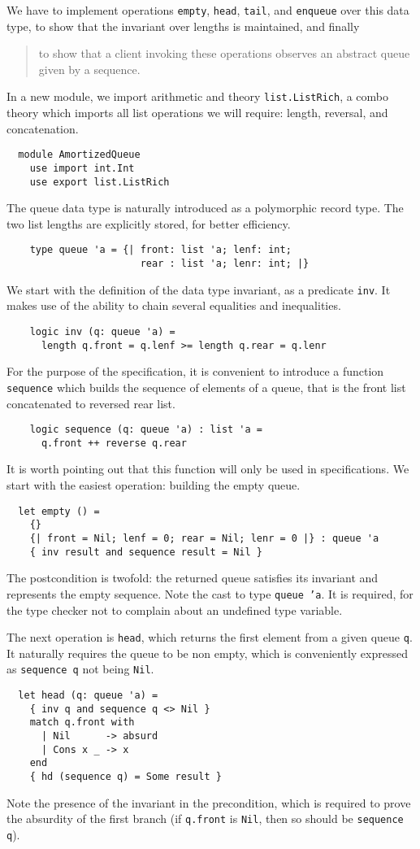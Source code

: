 We have to implement operations \texttt{empty}, \texttt{head},
\texttt{tail}, and \texttt{enqueue} over this data type,
to show that the invariant over lengths is maintained, and finally
\begin{quote}
  to show that a client invoking these operations
  observes an abstract queue given by a sequence.
\end{quote}
In a new module, we import arithmetic and theory
\texttt{list.ListRich}, a combo theory which imports all list
operations we will require: length, reversal, and concatenation.
\begin{verbatim}
  module AmortizedQueue
    use import int.Int
    use export list.ListRich
\end{verbatim}
The queue data type is naturally introduced as a polymorphic record type.
The two list lengths are explicitly stored, for better efficiency.
\begin{verbatim}
    type queue 'a = {| front: list 'a; lenf: int;
                       rear : list 'a; lenr: int; |}
\end{verbatim}
We start with the definition of the data type invariant, as a
predicate \texttt{inv}. It makes use of the ability to chain
several equalities and inequalities.
\begin{verbatim}
    logic inv (q: queue 'a) =
      length q.front = q.lenf >= length q.rear = q.lenr
\end{verbatim}
For the purpose of the specification, it is convenient to introduce a function
\texttt{sequence} which builds the sequence of elements of a queue, that
is the front list concatenated to reversed rear list.
\begin{verbatim}
    logic sequence (q: queue 'a) : list 'a =
      q.front ++ reverse q.rear
\end{verbatim}
It is worth pointing out that this function will only be used in
specifications.
We start with the easiest operation: building the empty queue.
\begin{verbatim}
  let empty () =
    {}
    {| front = Nil; lenf = 0; rear = Nil; lenr = 0 |} : queue 'a
    { inv result and sequence result = Nil }
\end{verbatim}
The postcondition is twofold: the returned queue satisfies its
invariant and represents the empty sequence.
Note the cast to type \texttt{queue 'a}. It is required, for the
type checker not to complain about an undefined type variable.

The next operation is \texttt{head}, which returns the first element from
a given queue \texttt{q}. It naturally requires the queue to be non
empty, which is conveniently expressed as \texttt{sequence q} not
being \texttt{Nil}.
\begin{verbatim}
  let head (q: queue 'a) =
    { inv q and sequence q <> Nil }
    match q.front with
      | Nil      -> absurd
      | Cons x _ -> x
    end
    { hd (sequence q) = Some result }
\end{verbatim}
Note the presence of the invariant in the precondition, which is
required to prove the absurdity of the first branch (if
\texttt{q.front} is \texttt{Nil}, then so should be \texttt{sequence q}).

